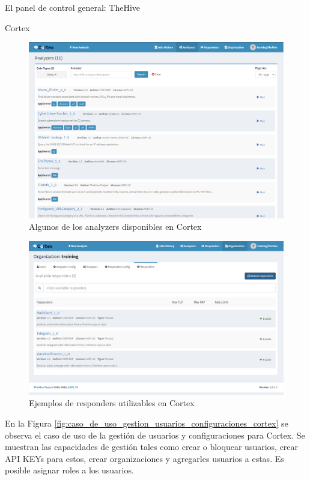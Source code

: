 \begin{section}{El panel de control general: TheHive }
\begin{subsection}{Cortex}
     \begin{figure}[H]
        \centering
        \includegraphics[width=1\textwidth]{./descripcion_sonion_imagenes/figura_26_analyzers_disponibles.png}
        \caption{Algunos de los analyzers disponibles en Cortex}
        \label{fig:analizers_disponibles}
     \end{figure}
     \begin{figure}[H]
        \centering
        \includegraphics[width=1\textwidth]{./descripcion_sonion_imagenes/figura_27_responders_cortex.png}
        \caption{Ejemplos de responders utilizables en Cortex}
        \label{fig:ejemplos_responders_cortex}
     \end{figure}  
     \FloatBarrier
     En la Figura \ref{fig:caso_de_uso_gestion_usuarios_configuraciones_cortex} se observa el caso de uso de la gestión de usuarios y configuraciones para Cortex. Se muestran las capacidades de gestión tales como crear o bloquear usuarios, crear API KEYs para estos, crear organizaciones y agregarles usuarios a estas. Es posible asignar roles a los usuarios.

\end{subsection}
\end{section}
